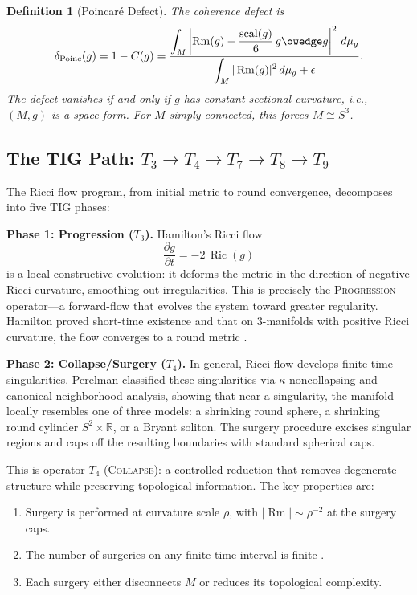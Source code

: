 \documentclass[11pt]{article}
\newtheorem{definition}[theorem]{Definition}
\DeclareMathOperator{\Ric}{Ric}
\DeclareMathOperator{\Rm}{Rm}
\DeclareMathOperator{\scal}{scal}
\begin{document}
\begin{definition}[Poincar\'e Defect]
\label{def:poinc-defect}
The coherence defect is
\[
\delta_{\mathrm{Poinc}}(g) = 1 - C(g)
= \frac{\displaystyle\int_M \left|\Rm(g)
    - \frac{\scal(g)}{6}\, g \owedge g\right|^2 \, d\mu_g}
{\displaystyle\int_M |\Rm(g)|^2 \, d\mu_g + \epsilon}.
\]
The defect vanishes if and only if $g$ has constant sectional curvature,
i.e., $(M, g)$ is a space form.  For $M$ simply connected, this forces
$M \cong S^3$.
\end{definition}

\subsection{The TIG Path: $T_3 \to T_4 \to T_7 \to T_8 \to T_9$}
\label{subsec:poinc-path}

The Ricci flow program, from initial metric to round convergence,
decomposes into five TIG phases:

\medskip
\noindent
\textbf{Phase 1: Progression ($T_3$).}
Hamilton's Ricci flow \cite{Ham82}
\begin{equation}
\label{eq:ricci}
\frac{\partial g}{\partial t} = -2\, \Ric(g)
\end{equation}
is a local constructive evolution: it deforms the metric in the
direction of negative Ricci curvature, smoothing out irregularities.
This is precisely the \textsc{Progression} operator---a forward-flow
that evolves the system toward greater regularity.  Hamilton proved
short-time existence and that on 3-manifolds with positive Ricci
curvature, the flow converges to a round metric \cite{Ham82}.

\medskip
\noindent
\textbf{Phase 2: Collapse/Surgery ($T_4$).}
In general, Ricci flow develops finite-time singularities.  Perelman
\cite{Per2} classified these singularities via $\kappa$-noncollapsing
and canonical neighborhood analysis, showing that near a singularity,
the manifold locally resembles one of three models: a shrinking round
sphere, a shrinking round cylinder $S^2 \times \mathbb{R}$, or a
Bryant soliton.  The surgery procedure excises singular regions and
caps off the resulting boundaries with standard spherical caps.

This is operator $T_4$ (\textsc{Collapse}): a controlled reduction that
removes degenerate structure while preserving topological information.
The key properties are:
\begin{enumerate}
\item Surgery is performed at curvature scale $\rho$, with
$|\Rm| \sim \rho^{-2}$ at the surgery caps.
\item The number of surgeries on any finite time interval is finite
\cite{Per2}.
\item Each surgery either disconnects $M$ or reduces its topological
complexity.
\end{enumerate}
\end{document}
